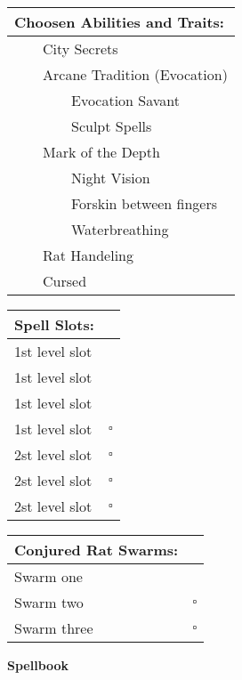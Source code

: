 \documentclass[11pt]{article}
\newcommand{\done}{\rlap{$\square$}{\raisebox{2pt}{\large\hspace{1pt}\ding{51}}}}
\newcommand{\available}{$\square$}
\newcommand{\tabitem}{~~\llap{--}~~}
\newcommand{\tabtabitem}{~~~~~~\llap{$\bullet$}~~}
\begin{document}
\begin{multicols}{2}
\vspace{4mm}

\noindent \begin{tabularx}{95mm}{@{}l}
{\Large \textbf{Choosen Abilities and Traits:}} \\
\hline
\tabitem City Secrets \\
\tabitem Arcane Tradition (Evocation) \\
\tabtabitem Evocation Savant \\
\tabtabitem Sculpt Spells \\
\tabitem Mark of the Depth \\
\tabtabitem Night Vision \\
\tabtabitem Forskin between fingers \\
\tabtabitem Waterbreathing \\
\tabitem Rat Handeling \\
\tabitem Cursed
		\end{tabularx}

\vspace{4mm}

\noindent \begin{tabularx}{95mm}{@{}l c}
{\Large \textbf{Spell Slots:}} & \\
\hline
1st level slot & \done \\
1st level slot & \done \\
1st level slot & \done \\
1st level slot & \available \\
2st level slot & \available \\
2st level slot & \available \\
2st level slot & \available
		\end{tabularx}

\vspace{4mm}

\noindent \begin{tabularx}{95mm}{@{}l c}
{\Large \textbf{Conjured Rat Swarms:}} & \\
\hline
Swarm one & \done \\
Swarm two & \available \\
Swarm three & \available
		\end{tabularx}
	\end{multicols}

\clearpage

	\begin{center}
{\LARGE \textbf{Spellbook}}
	\end{center}
\end{document}

